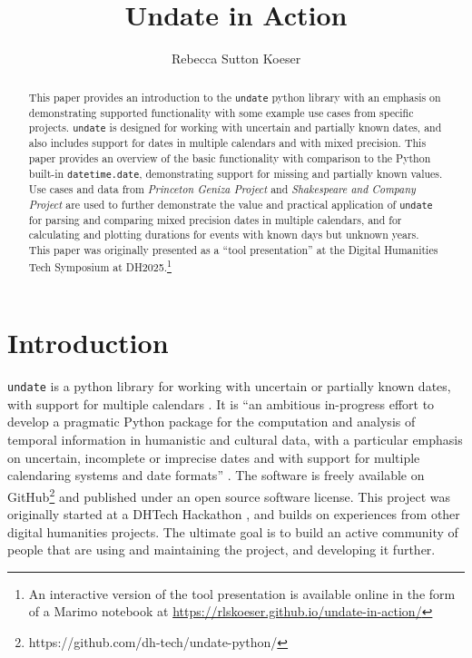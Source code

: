 \documentclass[final]{anthology-ch} %
\title{Undate in Action}
\author[1]{Rebecca Sutton Koeser}[
  orcid=0000-0002-8762-8057
]
\affiliation{1}{Center for Digital Humanities, Princeton University, Princeton, New Jersey, USA}
\begin{document}
\maketitle

\begin{abstract}
This paper provides an introduction to the \texttt{undate} python library with an emphasis on demonstrating supported functionality with some example use cases from specific projects. \texttt{undate} is designed for working with uncertain and partially known dates, and also includes support for dates in multiple calendars and with mixed precision. This paper provides an overview of the basic functionality with comparison to the Python built-in \texttt{datetime.date}, demonstrating support for missing and partially known values. Use cases and data from \textit{Princeton Geniza Project} and \textit{Shakespeare and Company Project} are used to further demonstrate the value and practical application of \texttt{undate} for parsing and comparing mixed precision dates in multiple calendars, and for calculating and plotting durations for events with known days but unknown years. This paper was originally presented as a ``tool presentation'' at the Digital Humanities Tech Symposium at DH2025.\footnote{An interactive version of the tool presentation is available online in the form of a Marimo notebook at \href{https://rlskoeser.github.io/undate-in-action/}{https://rlskoeser.github.io/undate-in-action/}}
\end{abstract}

\section{Introduction} 

\texttt{undate} is a python library for working with uncertain or partially known dates, with support for multiple calendars \cite{koeser_undate_python_2025}. It is ``an ambitious in-progress effort to develop a pragmatic Python package for the computation and analysis of temporal information in humanistic and cultural data, with a particular emphasis on uncertain, incomplete or imprecise dates and with support for multiple calendaring systems and date formats'' \cite{koeser_undate_2025}. The software is freely available on GitHub\footnote{https://github.com/dh-tech/undate-python/} and published under an open source software license. This project was originally started at a DHTech Hackathon \cite{koeser_join_2023}, and builds on experiences from other digital humanities projects. The ultimate goal is to build an active community of people that are using and maintaining the project, and developing it further.
\end{document}
